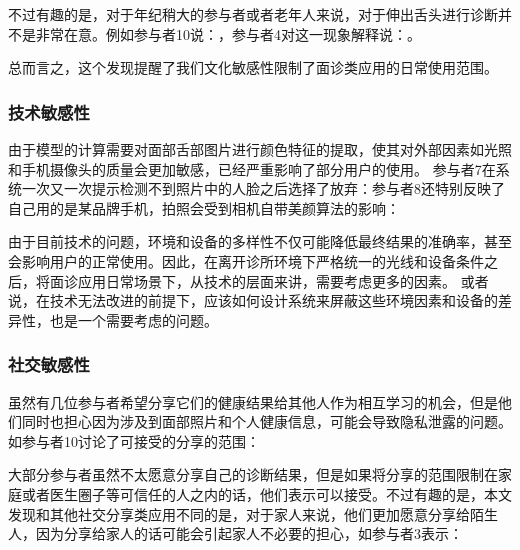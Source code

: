 不过有趣的是，对于年纪稍大的参与者或者老年人来说，对于伸出舌头进行诊断并不是非常在意。例如参与者10说：，参与者4对这一现象解释说：。

总而言之，这个发现提醒了我们文化敏感性限制了面诊类应用的日常使用范围。


\subsubsection{技术敏感性}


由于模型的计算需要对面部舌部图片进行颜色特征的提取，使其对外部因素如光照和手机摄像头的质量会更加敏感，已经严重影响了部分用户的使用。
参与者7在系统一次又一次提示检测不到照片中的人脸之后选择了放弃：参与者8还特别反映了自己用的是某品牌手机，拍照会受到相机自带美颜算法的影响：

由于目前技术的问题，环境和设备的多样性不仅可能降低最终结果的准确率，甚至会影响用户的正常使用。因此，在离开诊所环境下严格统一的光线和设备条件之后，将面诊应用日常场景下，从技术的层面来讲，需要考虑更多的因素。
或者说，在技术无法改进的前提下，应该如何设计系统来屏蔽这些环境因素和设备的差异性，也是一个需要考虑的问题。

\subsubsection{社交敏感性}


虽然有几位参与者希望分享它们的健康结果给其他人作为相互学习的机会，但是他们同时也担心因为涉及到面部照片和个人健康信息，可能会导致隐私泄露的问题。
如参与者10讨论了可接受的分享的范围：

大部分参与者虽然不太愿意分享自己的诊断结果，但是如果将分享的范围限制在家庭或者医生圈子等可信任的人之内的话，他们表示可以接受。不过有趣的是，本文发现和其他社交分享类应用不同的是，对于家人来说，他们更加愿意分享给陌生人，因为分享给家人的话可能会引起家人不必要的担心，如参与者3表示：



